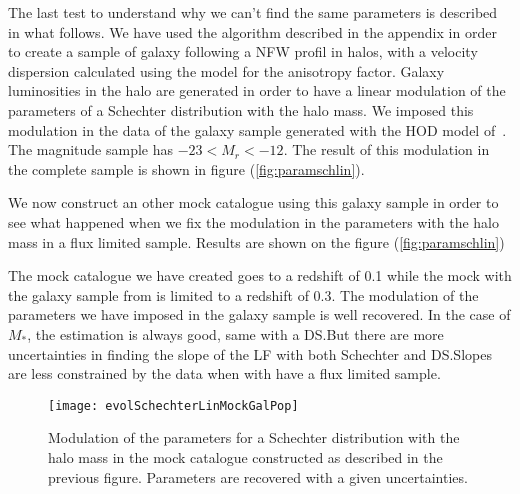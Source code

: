 The last test to understand why we can't find the same parameters is described in what follows. We have used the algorithm described
in the appendix  in order to create a
sample of galaxy following a NFW profil in halos, with a velocity dispersion calculated using the \citet{ML05} model for the
anisotropy factor. Galaxy luminosities in the halo are generated in order to have a linear modulation of the parameters of a
Schechter distribution with the halo mass. We imposed this modulation in the data of the galaxy sample generated with the HOD model
of~\cite{Zehavi+11}. The magnitude sample has $\num{-23}<M_r<\num{-12}$. The result of this modulation in the complete sample is
shown in figure (\ref{fig:paramschlin}).

We now construct an other mock catalogue using this galaxy sample in order to see what happened when we fix the modulation in the
parameters with the halo mass in a flux limited sample.
Results are shown on the figure (\ref{fig:paramschlin})

The mock catalogue we have created goes to a redshift of \num{0.1} while the mock with the galaxy sample from \citet{Guo+11} is
limited to a redshift of \num{0.3}.
The modulation of the parameters we have imposed in the galaxy sample is well recovered. In the case of $M_*$, the estimation
is always good, same with a DS.\@ But there are more uncertainties in finding the slope of the LF with both Schechter and DS.\@ Slopes
are less constrained by the data when with have a flux limited sample.
\begin{figure}[htb]
    \centering
    \texttt{[image: evolSchechterLinMockGalPop]}
    \caption{\footnotesize{}Modulation of the parameters for a Schechter distribution with the halo mass in the mock catalogue
    constructed as described in the previous figure. Parameters are recovered with a given uncertainties.}
\label{fig:paramschlinmock}
\end{figure}

